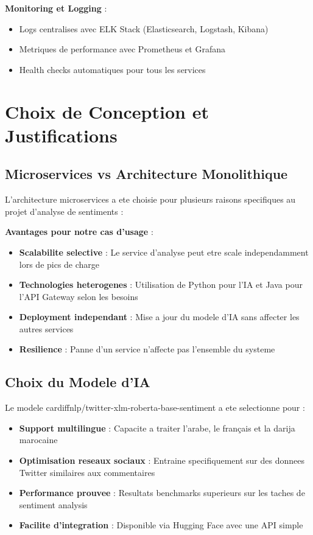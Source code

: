 \textbf{Monitoring et Logging} :
\begin{itemize}
    \item Logs centralises avec ELK Stack (Elasticsearch, Logstash, Kibana)
    \item Metriques de performance avec Prometheus et Grafana
    \item Health checks automatiques pour tous les services
\end{itemize}

\section{Choix de Conception et Justifications}

\subsection{Microservices vs Architecture Monolithique}

L'architecture microservices a ete choisie pour plusieurs raisons specifiques au projet d'analyse de sentiments :

\textbf{Avantages pour notre cas d'usage} :
\begin{itemize}
    \item \textbf{Scalabilite selective} : Le service d'analyse peut etre scale independamment lors de pics de charge
    \item \textbf{Technologies heterogenes} : Utilisation de Python pour l'IA et Java pour l'API Gateway selon les besoins
    \item \textbf{Deployment independant} : Mise a jour du modele d'IA sans affecter les autres services
    \item \textbf{Resilience} : Panne d'un service n'affecte pas l'ensemble du systeme
\end{itemize}

\subsection{Choix du Modele d'IA}

Le modele cardiffnlp/twitter-xlm-roberta-base-sentiment a ete selectionne pour :

\begin{itemize}
    \item \textbf{Support multilingue} : Capacite a traiter l'arabe, le français et la darija marocaine
    \item \textbf{Optimisation reseaux sociaux} : Entraine specifiquement sur des donnees Twitter similaires aux commentaires
    \item \textbf{Performance prouvee} : Resultats benchmarks superieurs sur les taches de sentiment analysis
    \item \textbf{Facilite d'integration} : Disponible via Hugging Face avec une API simple
\end{itemize}

